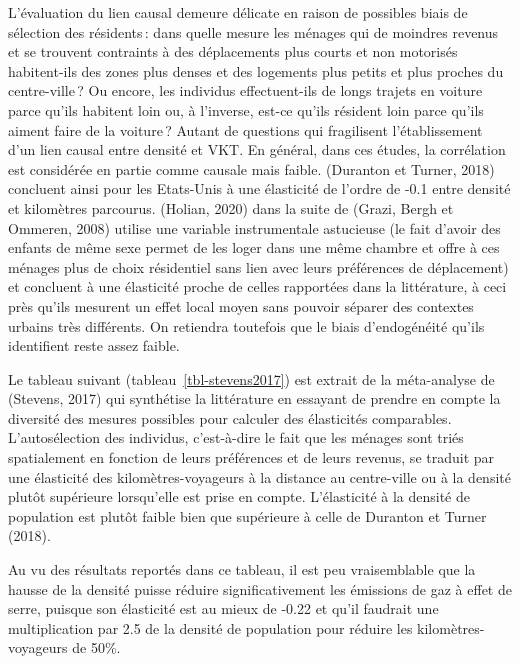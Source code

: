\documentclass[
  9pt,
  a4paper,
  DIV=11]{scrreprt}
\begin{document}
L'évaluation du lien causal demeure délicate en raison de possibles
biais de sélection des résidents\,: dans quelle mesure les ménages qui
de moindres revenus et se trouvent contraints à des déplacements plus
courts et non motorisés habitent-ils des zones plus denses et des
logements plus petits et plus proches du centre-ville\,? Ou encore, les
individus effectuent-ils de longs trajets en voiture parce qu'ils
habitent loin ou, à l'inverse, est-ce qu'ils résident loin parce qu'ils
aiment faire de la voiture\,? Autant de questions qui fragilisent
l'établissement d'un lien causal entre densité et VKT. En général, dans
ces études, la corrélation est considérée en partie comme causale mais
faible. (Duranton et Turner, 2018) concluent ainsi pour les Etats-Unis à
une élasticité de l'ordre de -0.1 entre densité et kilomètres parcourus.
(Holian, 2020) dans la suite de (Grazi, Bergh et Ommeren, 2008) utilise
une variable instrumentale astucieuse (le fait d'avoir des enfants de
même sexe permet de les loger dans une même chambre et offre à ces
ménages plus de choix résidentiel sans lien avec leurs préférences de
déplacement) et concluent à une élasticité proche de celles rapportées
dans la littérature, à ceci près qu'ils mesurent un effet local moyen
sans pouvoir séparer des contextes urbains très différents. On retiendra
toutefois que le biais d'endogénéité qu'ils identifient reste assez
faible.

Le tableau suivant (tableau~\ref{tbl-stevens2017}) est extrait de la
méta-analyse de (Stevens, 2017) qui synthétise la littérature en
essayant de prendre en compte la diversité des mesures possibles pour
calculer des élasticités comparables. L'autosélection des individus,
c'est-à-dire le fait que les ménages sont triés spatialement en fonction
de leurs préférences et de leurs revenus, se traduit par une élasticité
des kilomètres-voyageurs à la distance au centre-ville ou à la densité
plutôt supérieure lorsqu'elle est prise en compte. L'élasticité à la
densité de population est plutôt faible bien que supérieure à celle de
Duranton et Turner (2018).

Au vu des résultats reportés dans ce tableau, il est peu vraisemblable
que la hausse de la densité puisse réduire significativement les
émissions de gaz à effet de serre, puisque son élasticité est au mieux
de -0.22 et qu'il faudrait une multiplication par 2.5 de la densité de
population pour réduire les kilomètres-voyageurs de 50\%.
\end{document}
